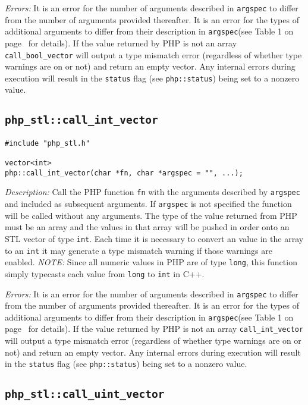 \documentclass[11pt,titlepage]{article}
\begin{document}
\emph{Errors:} It is an error for the number of arguments described in \verb|argspec| to differ from the number of arguments provided thereafter. It is an error for the types of additional arguments to differ from their description in \verb|argspec|(see Table 1 on page~\pageref{Table1} for details). If the value returned by PHP is not an array \verb|call_bool_vector| will output a type mismatch error (regardless of whether type warnings are on or not) and return an empty vector. Any internal errors during execution will result in the \verb|status| flag (see \verb|php::status|) being set to a nonzero value.


\subsection{\texttt{php\_stl::call\_int\_vector}}
\begin{verbatim}
#include "php_stl.h"

vector<int> 
php::call_int_vector(char *fn, char *argspec = "", ...);
\end{verbatim}

\emph{Description:} Call the PHP function \verb|fn| with the arguments described by \verb|argspec| and included as subsequent arguments. If \verb|argspec| is not specified the function will be called without any arguments. The type of the value returned from PHP must be an array and the values in that array will be pushed in order onto an STL vector of type \verb|int|. Each time it is necessary to convert an value in the array to an \verb|int| it may generate a type mismatch warning if those warnings are enabled. \emph{NOTE:} Since all numeric values in PHP are of type \verb|long|, this function simply typecasts each value from \verb|long| to \verb|int| in C++.

\emph{Errors:} It is an error for the number of arguments described in \verb|argspec| to differ from the number of arguments provided thereafter. It is an error for the types of additional arguments to differ from their description in \verb|argspec|(see Table 1 on page~\pageref{Table1} for details). If the value returned by PHP is not an array \verb|call_int_vector| will output a type mismatch error (regardless of whether type warnings are on or not) and return an empty vector. Any internal errors during execution will result in the \verb|status| flag (see \verb|php::status|) being set to a nonzero value.


\subsection{\texttt{php\_stl::call\_uint\_vector}}
\end{document}
